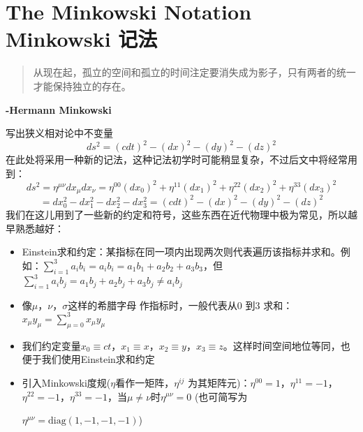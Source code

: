 \section[Minkowski记法]{The Minkowski Notation Minkowski 记法}
\label{sec2.4}
\begin{quote}
从现在起，孤立的空间和孤立的时间注定要消失成为影子，只有两者的统一才能保持独立的存在。
\end{quote}
\begin{flushright}
  {\bf{-Hermann Minkowski}}
\end{flushright}
写出狭义相对论中不变量
\begin{equation}\label{eq2.23}
 ds^2=(cdt)^2-(dx)^2-(dy)^2-(dz)^2
\end{equation}
在此处将采用一种新的记法，这种记法初学时可能稍显复杂，不过后文中将经常用到：
\[
 ds^2=\eta^{\mu\nu}dx_\mu dx_\nu
  =\eta^{00}(dx_0)^2+\eta^{11}(dx_1)^2+\eta^{22}(dx_2)^2+\eta^{33}(dx_3)^2
\]
\begin{equation}\label{eq2.24}
 =dx_0^2-dx_1^2-dx_2^2-dx_3^2=(cdt)^2-(dx)^2-(dy)^2-(dz)^2
\end{equation}
我们在这儿用到了一些新的约定和符号，这些东西在近代物理中极为常见，所以越早熟悉越好：
\begin{itemize}
  \item Einstein求和约定：某指标在同一项内出现两次则代表遍历该指标并求和。例如：$\sum_{i=1}^3a_i b_i =a_i b_i=a_1 b_1 +a_2 b_2 +a_3 b_3$，但$\sum_{i=1}^3a_i b_j=a_1 b_j +a_2 b_j +a_3 b_j\neq a_i b_j$
  \item 像$\mu$，$\nu$，$\sigma$这样的希腊字母
   作指标时，一般代表从0 到3 求和：$x_\mu y_\mu=\sum_{\mu=0}^3 x_\mu y_\mu $
  \item 我们约定变量$x_0\equiv ct$，$x_1\equiv x$，$x_2\equiv y$，$x_3\equiv z$。这样时间空间地位等同，也便于我们使用Einstein求和约定
  \item 引入Minkowski度规($\eta$看作一矩阵，$\eta^{ij}$ 为其矩阵元)：$\eta^{00}=1$，$\eta^{11}=-1$，$\eta^{22}=-1$，$\eta^{33}=-1$，当$\mu \neq \nu$时$\eta^{\mu\nu}=0$  (也可简写为



      $\eta^{\mu\nu} = \mathrm{diag} (1,-1,-1,-1)$)
\end{itemize}

